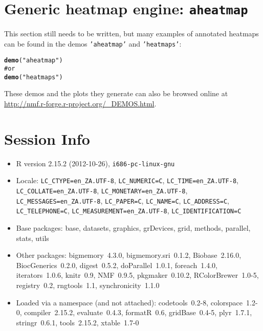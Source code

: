 \documentclass[a4paper]{article}\usepackage{graphicx, color}
\makeatletter
\newcommand{\hlfunctioncall}[1]{\textcolor[rgb]{0.501960784313725,0,0.329411764705882}{\textbf{#1}}}%
\newcommand{\hlstring}[1]{\textcolor[rgb]{0.6,0.6,1}{#1}}%
\newcommand{\hlcomment}[1]{\textcolor[rgb]{0.180392156862745,0.6,0.341176470588235}{#1}}%
\newenvironment{kframe}{%
 \def\at@end@of@kframe{}%
 \ifinner\ifhmode%
  \def\at@end@of@kframe{\end{minipage}}%
  \begin{minipage}{\columnwidth}%
 \fi\fi%
 \def\FrameCommand##1{\hskip\@totalleftmargin \hskip-\fboxsep
 \colorbox{shadecolor}{##1}\hskip-\fboxsep
     \hskip-\linewidth \hskip-\@totalleftmargin \hskip\columnwidth}%
 \MakeFramed {\advance\hsize-\width
   \@totalleftmargin\z@ \linewidth\hsize
   \@setminipage}}%
 {\par\unskip\endMakeFramed%
 \at@end@of@kframe}
\newenvironment{knitrout}{}{} %
\let\code=\texttt
\makeatother
\begin{document}
\section{Generic heatmap engine: \texttt{aheatmap}}
\label{sec:aheatmap}

This section still needs to be written, but many examples of annotated heatmaps can be found in the demos \code{'aheatmap'} and \code{'heatmaps'}:
\begin{knitrout}
\color{fgcolor}\begin{kframe}
\begin{alltt}
\hlfunctioncall{demo}(\hlstring{"aheatmap"})
\hlcomment{# or}
\hlfunctioncall{demo}(\hlstring{"heatmaps"})
\end{alltt}
\end{kframe}
\end{knitrout}


These demos and the plots they generate can also be browsed online at \url{http://nmf.r-forge.r-project.org/_DEMOS.html}.

\section{Session Info}
\begin{itemize}\raggedright
  \item R version 2.15.2 (2012-10-26), \verb|i686-pc-linux-gnu|
  \item Locale: \verb|LC_CTYPE=en_ZA.UTF-8|, \verb|LC_NUMERIC=C|, \verb|LC_TIME=en_ZA.UTF-8|, \verb|LC_COLLATE=en_ZA.UTF-8|, \verb|LC_MONETARY=en_ZA.UTF-8|, \verb|LC_MESSAGES=en_ZA.UTF-8|, \verb|LC_PAPER=C|, \verb|LC_NAME=C|, \verb|LC_ADDRESS=C|, \verb|LC_TELEPHONE=C|, \verb|LC_MEASUREMENT=en_ZA.UTF-8|, \verb|LC_IDENTIFICATION=C|
  \item Base packages: base, datasets, graphics, grDevices, grid,
    methods, parallel, stats, utils
  \item Other packages: bigmemory~4.3.0, bigmemory.sri~0.1.2,
    Biobase~2.16.0, BiocGenerics~0.2.0, digest~0.5.2,
    doParallel~1.0.1, foreach~1.4.0, iterators~1.0.6, knitr~0.9,
    NMF~0.9.5, pkgmaker~0.10.2, RColorBrewer~1.0-5, registry~0.2,
    rngtools~1.1, synchronicity~1.1.0
  \item Loaded via a namespace (and not attached):
    codetools~0.2-8, colorspace~1.2-0, compiler~2.15.2,
    evaluate~0.4.3, formatR~0.6, gridBase~0.4-5, plyr~1.7.1,
    stringr~0.6.1, tools~2.15.2, xtable~1.7-0
\end{itemize}



\printbibliography[heading=bibintoc]
\end{document}
